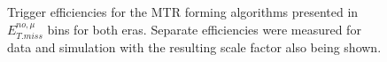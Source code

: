 \begin{figure}[htbp]
  \centering
  \caption{Trigger efficiencies for the MTR forming algorithms presented in $E_{T.miss}^{no,\mu}$ bins for both eras. Separate efficiencies were measured for data and simulation with the resulting scale factor also being shown.}
  \label{fig:metmht_effs}
\end{figure}


